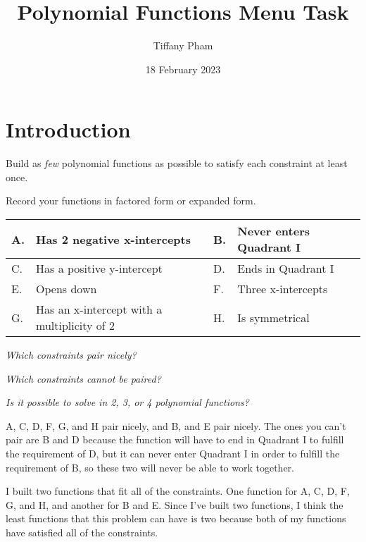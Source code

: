 \documentclass[pstricks,border=11pt]{article}
\title{Polynomial Functions Menu Task}
\author{Tiffany Pham}
\date{18 February 2023}
\begin{document}
\maketitle

\section{Introduction}
Build as \textit{few} polynomial functions as possible to satisfy each constraint at least once.
\vspace{5mm}
\begin{center}
Record your functions in factored form or expanded form.
\end{center}

\begin{table}[!ht]
\begin{tabular}{|l|p{2in}|l|p{2in}|} 
\hline
A. & Has 2 negative x-intercepts                                & B. & Never enters Quadrant I                \\ 
\hline
C. & Has a positive y-intercept & D. & Ends in Quadrant I         \\ 
\hline
E. & Opens down                & F. & Three x-intercepts           \\ 
\hline
G. & Has an x-intercept with a multiplicity of 2                     & H. & Is symmetrical  \\
\hline
\end{tabular}
\end{table}
\begin{center}
    \textit{Which constraints pair nicely?}
    
    \textit{Which constraints cannot be paired?}
    
    \textit{Is it possible to solve in 2, 3, or 4 polynomial functions?}
\end{center}

A, C, D, F, G, and H pair nicely, and B, and E pair nicely. The ones you can't pair are B and D because the function will have to end in Quadrant I to fulfill the requirement of D, but it can never enter Quadrant I in order to fulfill the requirement of B, so these two will never be able to work together. 

I built two functions that fit all of the constraints. One function for A, C, D, F, G, and H, and another for B and E. Since I've built two functions, I think the least functions that this problem can have is two because both of my functions have satisfied all of the constraints.
\end{document}
